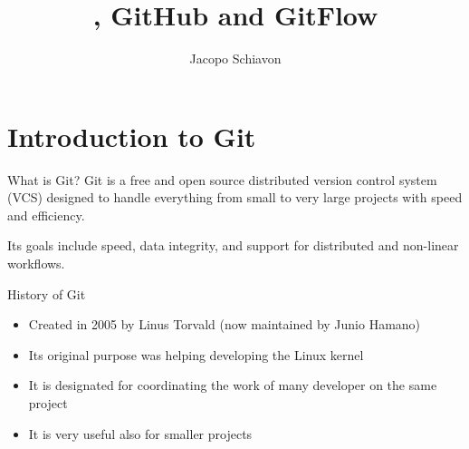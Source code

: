\documentclass{beamer}
\title{\git, GitHub and GitFlow}
\author{Jacopo Schiavon}
\institute[Dep. Statistical Sciences --- UNIPD]{Department of Statistical Sciences\\ University of Padova}
\newcommand{\git}{Git{}}
\begin{document}
\begin{frame}[plain]
    \maketitle
\end{frame}

\begin{frame}{}
\tableofcontents
\end{frame}

\section{Introduction to \git}
\begin{frame}{What is \git?}
    \alert{\git} is a \alert{free} and \alert{open source} distributed \alert{version control system} (VCS) designed to handle everything from small to very large projects with speed and efficiency. 
    
    Its goals include \alert{speed}, \alert{data integrity}, and support for \alert{distributed} and \alert{non-linear} workflows.
    
    \begin{block}{History of \git}
        \begin{itemize}
        \justifying
            \item Created in 2005 by Linus Torvald (now maintained by Junio Hamano)
            \item Its original purpose was helping developing the Linux kernel
            \item It is designated for coordinating the work of many developer on the same project
            \item It is very useful also for smaller projects
        \end{itemize}
    \end{block}
\end{frame}
\end{document}
